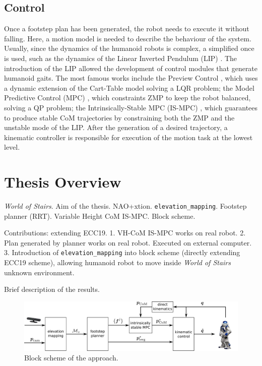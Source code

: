 \subsection{Control}
Once a footstep plan has been generated, the robot needs to execute it
without falling. Here, a motion model is needed to describe the behaviour of 
the system. Usually, since the dynamics of the humanoid robots is complex,
a simplified once is used, such as the dynamics of the Linear Inverted 
Pendulum (LIP) \cite{Kajita1991StudyOD}. The introduction of the LIP allowed
the development of control modules that generate humanoid gaits. The most 
famous works include the Preview Control \cite{Kajita2003BipedWP}, which
uses a dynamic extension of the Cart-Table model solving a LQR problem;
the Model Predictive Control (MPC) \cite{wieber:inria-00390462},
which constraints ZMP to keep the
robot balanced, solving a QP problem; the Intrinsically-Stable MPC (IS-MPC)
\cite{DBLP:conf/humanoids/SciancaCSLO16}, which guarantees to produce
stable CoM trajectories by constraining both the ZMP and the unstable mode
of the LIP. After the generation of a desired trajectory, a kinematic 
controller is responsible for execution of the motion task at the lowest
level.

\section{Thesis Overview}
\textit{World of Stairs}. Aim of the thesis. NAO+xtion.
\texttt{elevation\_mapping}. Footstep planner (RRT).
Variable Height CoM IS-MPC. Block scheme.

Contributions: extending ECC19.
1. VH-CoM IS-MPC works on real robot.
2. Plan generated by planner works on real robot. Executed on external computer.
3. Introduction of \texttt{elevation\_mapping} into block scheme (directly
extending ECC19 scheme), allowing humanoid robot to move inside
\textit{World of Stairs} unknown environment.

Brief description of the results.

\begin{figure}
  \centering
  \includegraphics[width=\textwidth]{figures/BlockScheme.pdf}
  \caption{Block scheme of the approach.}
  \label{fig:block-scheme}
\end{figure}

